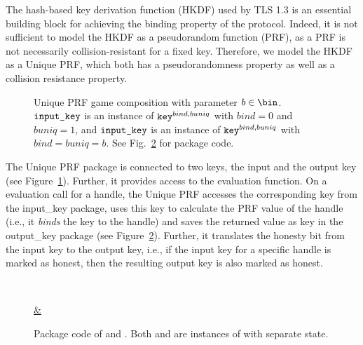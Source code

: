 The hash-based key derivation function (HKDF) used by TLS 1.3 is an essential building block for achieving the binding property of the protocol. Indeed, it is not sufficient to model the HKDF as a pseudorandom function (PRF), as a PRF is not necessarily collision-resistant for a fixed key. Therefore, we model the HKDF as a Unique PRF, which both has a pseudorandomness property as well as a collision resistance property.

\begin{figure}
 \centering
 
 \caption{Unique PRF game composition with parameter $b\in\bin$. $\text{\texttt{input\_key}}$ is an instance of $\text{\texttt{key}}^{bind,buniq}$
with $bind=0$ and $buniq=1$, and $\text{\texttt{input\_key}}$ is an instance of $\text{\texttt{key}}^{bind,buniq}$
with $bind=buniq=b$. See Fig.~\ref{fig:PRF_pkg} for package code.}
 \label{fig:PRF_graph}
\end{figure}

The Unique PRF package is connected to two keys, the input and the output key (see Figure~\ref{fig:PRF_graph}). Further, it provides access to the evaluation function. On a evaluation call for a handle, the Unique PRF accesses the corresponding key from the input\_key package, uses this key to calculate the PRF value of the handle (i.e., it \emph{binds} the key to the handle) and saves the returned value as key in the output\_key package (see Figure~\ref{fig:PRF_pkg}). Further, it translates the honesty bit from the input key to the output key, i.e., if the input key for a specific handle is marked as honest, then the resulting output key is also marked as honest.

\begin{figure}
 \centering
\begin{pchstack}
\begin{pcvstack}\underline{\underline{}}\\
\pcvspace
\end{pcvstack}\pchspace
\begin{pcvstack}\underline{\underline{ \& }}\\
\begin{pchstack}
\pchspace
\begin{pcvstack}
\pcvspace

\end{pcvstack}
\end{pchstack}
\end{pcvstack}
\end{pchstack}



 \caption{Package code of  and . Both  and  are instances of  with separate state.}
 \label{fig:PRF_pkg}
\end{figure}

